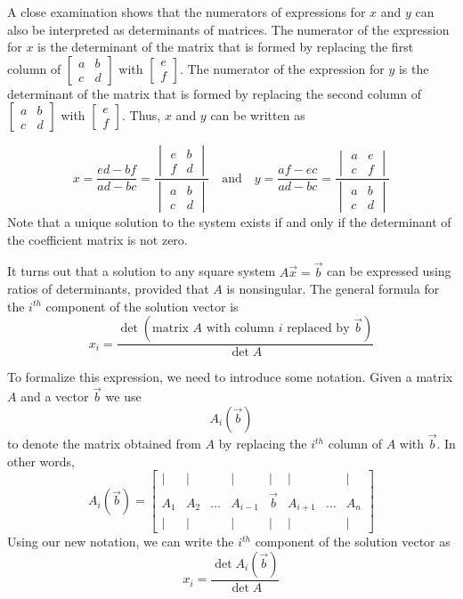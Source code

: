 \documentclass{ximera}
\begin{document}
 A close examination shows that the numerators of expressions for $x$ and $y$ can also be interpreted as determinants of matrices. The numerator of the expression for $x$ is the determinant of the matrix that is formed by replacing the first column of $\begin{bmatrix}a&b\\c&d\end{bmatrix}$ with $\begin{bmatrix}e\\f\end{bmatrix}$.  The numerator of the expression for $y$ is the determinant of the matrix that is formed by replacing the second column of $\begin{bmatrix}a&b\\c&d\end{bmatrix}$ with $\begin{bmatrix}e\\f\end{bmatrix}$.  Thus, $x$ and $y$ can be written as
 
 $$x=\frac{ed-bf}{ad-bc}=\frac{\begin{vmatrix}e&b\\f&d\end{vmatrix}}{\begin{vmatrix}a&b\\c&d\end{vmatrix}}\quad\text{and}\quad y=\frac{af-ec}{ad-bc}=\frac{\begin{vmatrix}a&e\\c&f\end{vmatrix}}{\begin{vmatrix}a&b\\c&d\end{vmatrix}}$$
Note that a unique solution to the system exists if and only if the determinant of the coefficient matrix is not zero.

It turns out that a solution to any square system $A\vec{x}=\vec{b}$ can be expressed using ratios of determinants, provided that $A$ is nonsingular.  The general formula for the $i^{th}$ component of the solution vector is
$$x_i=\frac{\det{(\text{matrix } A \text{ with column } i \text{ replaced by } \vec{b})}}{\det{A}}$$

To formalize this expression, we need to introduce some notation.  Given a matrix $A$ and a vector $\vec{b}$ we use 
$$A_i(\vec{b})$$
to denote the matrix obtained from $A$ by replacing the $i^{th}$ column of $A$ with $\vec{b}$. In other words,
$$A_i(\vec{b})=\begin{bmatrix}
           | & |& &|&|&|&&|\\
		A_1 & A_2&\dots &A_{i-1}&\vec{b}&A_{i+1}&\dots&A_n\\
		| & |& &|&|&|&&|
         \end{bmatrix}$$
Using our new notation, we can write the $i^{th}$ component of the solution vector as
$$x_i=\frac{\det{A_i(\vec{b})}}{\det{A}}$$
\end{document}
